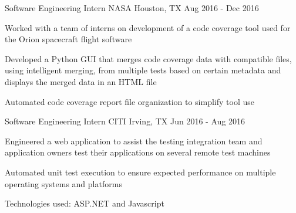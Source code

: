 \begin{cventries}
  \cventry
    {Software Engineering Intern} %
    {NASA} %
    {Houston, TX} %
    {Aug 2016 - Dec 2016} %
    {
      \begin{cvitems} %
        \item {Worked with a team of interns on development of a code coverage tool used for the Orion spacecraft flight software}
        \item {Developed a Python GUI that merges code coverage data with compatible files, using intelligent merging, from multiple tests based on certain metadata and displays the merged data in an HTML file}
        \item {Automated code coverage report file organization to simplify tool use}
      \end{cvitems}
    }

  \cventry
    {Software Engineering Intern} %
    {CITI} %
    {Irving, TX} %
    {Jun 2016 - Aug 2016} %
    {
      \begin{cvitems} %
        \item {Engineered a web application to assist the testing integration team and application owners test their applications on several remote test machines}
        \item {Automated unit test execution to ensure expected performance on multiple operating systems and platforms}
        \item {Technologies used: ASP.NET and Javascript }
      \end{cvitems}
    }

\end{cventries}
